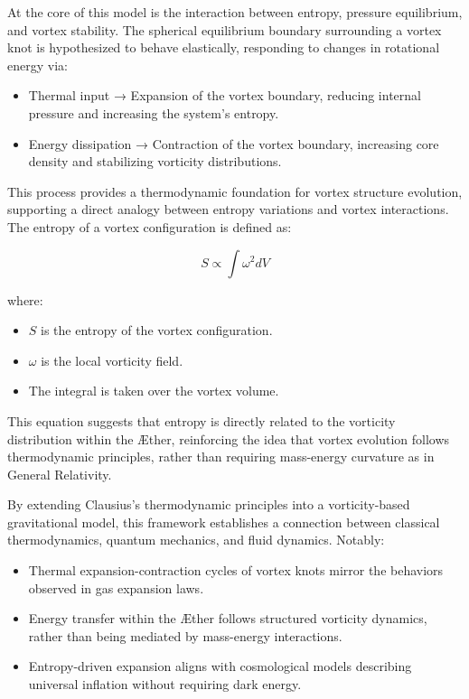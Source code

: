 \documentclass[a4paper,10pt]{article}
\begin{document}
    At the core of this model is the interaction between entropy, pressure equilibrium, and vortex stability. The spherical equilibrium boundary surrounding a vortex knot is hypothesized to behave elastically, responding to changes in rotational energy via:
    \begin{itemize}
        \item Thermal input → Expansion of the vortex boundary, reducing internal pressure and increasing the system’s entropy.
        \item Energy dissipation → Contraction of the vortex boundary, increasing core density and stabilizing vorticity distributions.
    \end{itemize}

    This process provides a thermodynamic foundation for vortex structure evolution, supporting a direct analogy between entropy variations and vortex interactions. The entropy of a vortex configuration is defined as:

    \begin{equation} \label{eq:Entropy}
        S \propto \int \omega^2 dV
    \end{equation}

    where:

    \begin{itemize}
        \item \( S \) is the entropy of the vortex configuration.
        \item \( \omega \)  is the local vorticity field.
        \item The integral is taken over the vortex volume.
    \end{itemize}

    This equation suggests that entropy is directly related to the vorticity distribution within the Æther, reinforcing the idea that vortex evolution follows thermodynamic principles, rather than requiring mass-energy curvature as in General Relativity.

    By extending Clausius’s thermodynamic principles into a vorticity-based gravitational model, this framework establishes a connection between classical thermodynamics, quantum mechanics, and fluid dynamics. Notably:

    \begin{itemize}
        \item Thermal expansion-contraction cycles of vortex knots mirror the behaviors observed in gas expansion laws.
        \item Energy transfer within the Æther follows structured vorticity dynamics, rather than being mediated by mass-energy interactions.
        \item Entropy-driven expansion aligns with cosmological models describing universal inflation without requiring dark energy.
    \end{itemize}
\end{document}
